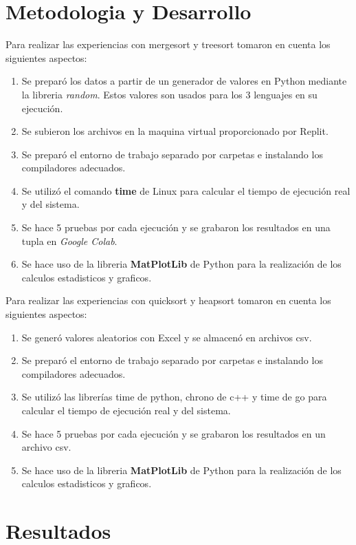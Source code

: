 \documentclass{article}
\begin{document}
    \section{Metodologia y Desarrollo}
    Para realizar las experiencias con mergesort y treesort tomaron en cuenta los siguientes aspectos:
    
    \begin{enumerate}
        \item Se preparó los datos a partir de un generador de valores en Python mediante la libreria \textit{random}. Estos valores son usados para los 3 lenguajes en su ejecución.
        \item Se subieron los archivos en la maquina virtual proporcionado por Replit.
        \item Se preparó el entorno de trabajo separado por carpetas e instalando los compiladores adecuados.
        \item Se utilizó el comando \textbf{time} de Linux para calcular el tiempo de ejecución real y del sistema.
        \item Se hace 5 pruebas por cada ejecución y se grabaron los resultados en una tupla en \textit{Google Colab}.
        \item Se hace uso de la libreria \textbf{MatPlotLib} de Python para la realización de los calculos estadisticos y graficos.
    \end{enumerate}
	Para realizar las experiencias con quicksort y heapsort tomaron en cuenta los siguientes aspectos:
	
	\begin{enumerate}
		\item Se generó valores aleatorios con Excel y se almacenó en archivos csv.
		\item Se preparó el entorno de trabajo separado por carpetas e instalando los compiladores adecuados.
		\item Se utilizó las librerías time de python, chrono de c++ y time de go para calcular el tiempo de ejecución real y del sistema.
		\item Se hace 5 pruebas por cada ejecución y se grabaron los resultados en un archivo csv.
		\item Se hace uso de la libreria \textbf{MatPlotLib} de Python para la realización de los calculos estadisticos y graficos.
	\end{enumerate}

\section{Resultados}
\end{document}
